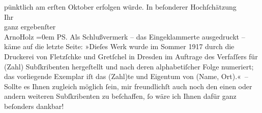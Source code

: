 \begin{ledgroupsized}[t]{13cm}
                    pünktlich am erſten Oktober erfolgen würde.\pend
           \pstart
           In beſonderer Hochſchätzung{\\[\baselineskip]}Ihr{\\[\baselineskip]}ganz ergebenſter{\\[\baselineskip]}\spacefill\mbox{ArnoHolz}\pend
           \leftskip=0em{}\pstart
           PS. Als Schlußvermerk – das Eingeklammerte ausgedruckt – käme auf die letzte
                    Seite:\pend
           \pstart
           »Dieſes Werk wurde im Sommer 1917 durch die Druckerei von Fletzſchke und Gretſchel in Dresden im Auftrage des Verfaſſers für (Zahl)
                    Subſkribenten hergeſtellt und nach deren alphabetiſcher Folge numeriert; das
                    vorliegende Exemplar iſt das (Zahl)te und Eigentum von (Name, Ort).« –\pend
           \pstart
           Sollte es Ihnen zugleich möglich ſein, mir freundlichſt auch noch den einen oder
                    andern weiteren Subſkribenten zu beſchaffen, ſo wäre ich Ihnen dafür ganz
                    beſonders dankbar!\pend
           
         
         \endnumbering{}\end{ledgroupsized}  \newcommand{\dateiname}{L02255}\newcommand{\titel}{Arno Holz an Arthur Schnitzler, 11. 2. 1917}\newcommand{\editorInnen}{Martin Anton Müller und Gerd-Hermann Susen}
      